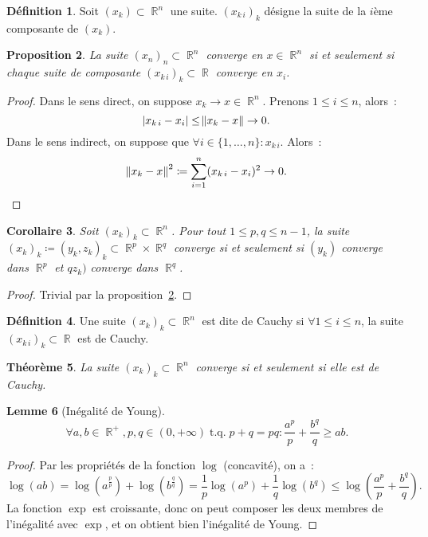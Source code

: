 \documentclass{article}
\DeclareMathOperator{\R}{\mathbb R}
\DeclareMathOperator{\tq}{ t.q. }
\newtheorem{thm}{Théorème}[section]
\newtheorem{prp}[thm]{Proposition}
\newtheorem{cor}[thm]{Corollaire}
\newtheorem{lem}[thm]{Lemme}
\theoremstyle{definition}
\newtheorem{déf}[thm]{Définition}
\theoremstyle{remark}
\begin{document}
		\begin{déf} Soit $(x_k) \subset \R^n$ une suite. $(x_{k\,i})_k$ désigne la suite de la $i$ème composante de $(x_k)$. \end{déf}

		\begin{prp}\label{convergenceRnComposantes} La suite $(x_n)_n \subset \R^n$ converge en $x \in \R^n$ si et seulement si chaque suite de composante
		$(x_{k\,i})_k \subset \R$ converge en $x_i$. \end{prp}

		\begin{proof} Dans le sens direct, on suppose $x_k \to x \in \R^n$. Prenons $1 \leq i \leq n$, alors~:
		\[\abs {x_{k\,i} - x_i} \leq \norm {x_k - x} \to 0.\]
		Dans le sens indirect, on suppose que $\forall i \in \{1, \dotsc, n\} : x_{k\,i}$. Alors~:
		\[\norm {x_k - x}^2 \coloneqq \sum_{i=1}^n(x_{k\,i} - x_i)^2 \to 0.\]
		\end{proof}

		\begin{cor} Soit $(x_k)_k \subset \R^n$. Pour tout $1 \leq p, q \leq n-1$, la suite $(x_k)_k \coloneqq (y_k, z_k)_k \subset \R^p \times \R^q$
		converge si et seulement si $(y_k)$ converge dans $\R^p$ et $qz_k)$ converge dans $\R^q$. \end{cor}

		\begin{proof} Trivial par la proposition~\ref{convergenceRnComposantes}. \end{proof}

		\begin{déf} Une suite $(x_k)_k \subset \R^n$ est dite de Cauchy si $\forall 1 \leq i \leq n$, la suite $(x_{k\,i})_k \subset \R$ est de Cauchy. \end{déf}

		\begin{thm} La suite $(x_k)_k \subset \R^n$ converge si et seulement si elle est de Cauchy. \end{thm}

		\begin{lem}[Inégalité de Young] \[\forall a, b \in \R^+, p, q \in (0, +\infty) \tq p+q=pq : \frac {a^p}p + \frac {b^q}q \geq ab.\] \end{lem}

		\begin{proof} Par les propriétés de la fonction $\log$ (concavité), on a~:
		\[\log(ab) = \log\left(a^{\frac pp}\right) + \log\left(b^{\frac qq}\right) = \frac 1p\log\left(a^p\right) + \frac 1q\log\left(b^q\right) \leq \log\left(\frac {a^p}p + \frac {b^q}q\right).\]
		La fonction $\exp$ est croissante, donc on peut composer les deux membres de l'inégalité avec $\exp$, et on obtient bien l'inégalité de Young.
		\end{proof}
\end{document}
